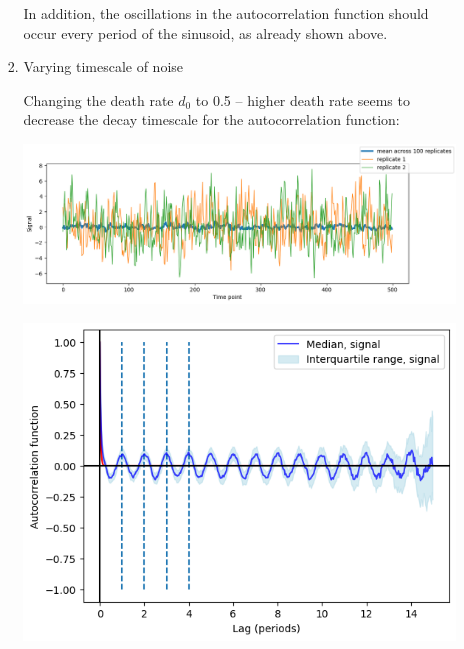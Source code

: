 \begin{enumerate}
\begin{enumerate}
\begin{enumerate}
In addition, the oscillations in the autocorrelation function should occur every period of the sinusoid, as already shown above.

\item Varying timescale of noise
\label{sec:org7d5f612}

Changing the death rate \(d_{0}\) to 0.5 -- higher death rate seems to decrease the decay timescale for the autocorrelation function:
\begin{center}
\includegraphics[width=.9\linewidth]{gillespie_k5_d0p5_mean.png}
\end{center}
\begin{center}
\includegraphics[width=.9\linewidth]{gillespie_k5_d0p5_acf.png}
\end{center}


\end{enumerate}
\end{enumerate}
\end{enumerate}
